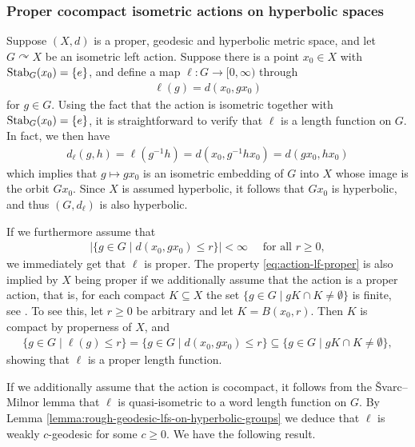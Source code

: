 \documentclass[12pt,a4paper,oneside,final,reqno]{amsart}
\def\acts{\curvearrowright}
\theoremstyle{plain}
\theoremstyle{definition}
\begin{document}
\subsubsection{Proper cocompact isometric actions on hyperbolic spaces}
Suppose $(X,d)$ is a proper, geodesic and hyperbolic metric space, and let $G \acts X$ be an  
isometric left action. 
Suppose there is a point $x_0 \in X$ with ${\rm Stab}_G (x_0) = \{e\}$, 
and define a map $\ell \colon G \to [0,\infty)$ through
\begin{align}\label{eq:length-function-from-action}
    \ell(g) = d(x_0 , g x_0)
\end{align}
for $g \in G$. Using the fact that the action is isometric together with ${\rm Stab}_G(x_0) = \{e\}$, it is straightforward to verify that $\ell$ is a length function on $G$. In fact, we then have
\begin{align*}
    d_{\ell}(g,h) = \ell(g^{-1}h) = d(x_0 , g^{-1}hx_0) = d(gx_0, hx_0)
\end{align*}
which implies that $g \mapsto g x_0$ is an isometric embedding of $G$ into $X$ whose image is the orbit $Gx_0$. Since $X$ is assumed hyperbolic, it follows that $Gx_0$ is hyperbolic, and thus $(G, d_\ell)$ is also hyperbolic. 

If we furthermore assume that
\begin{align}\label{eq:action-lf-proper}
    |\{g \in G \mid d(x_0, gx_0) \leq r \} |< \infty \quad \text{ for all $r \geq 0$},
\end{align}
we immediately get that 
$\ell$ is proper. The property \eqref{eq:action-lf-proper} is also implied by $X$ being proper if we additionally assume that the action is a proper action, that is, for each compact $K \subseteq X$ the set $\{g \in G \mid gK \cap K \neq \emptyset \}$ is finite, see \cite[I.8.3]{BridsonHaefligerMetricSpacesBook}. To see this, let $r\geq 0$ be arbitrary and let $K = B(x_0, r)$. Then $K$ is compact by properness of $X$, and 
\begin{align*}
    \{g \in G \mid \ell(g) \leq r \} = \{g \in G \mid d(x_0 , gx_0) \leq r \} \subseteq \{g \in G \mid gK \cap K \neq \emptyset \},
\end{align*}
showing that $\ell$ is a proper length function. 

If we additionally assume that the action is cocompact, it follows from the \v{S}varc--Milnor lemma \cite[Proposition I.8.19]{BridsonHaefligerMetricSpacesBook} that $\ell$ is quasi-isometric to a word length function on $G$. By Lemma \ref{lemma:rough-geodesic-lfs-on-hyperbolic-groups} we deduce that $\ell$ is weakly $c$-geodesic for some $c\geq 0$. We have the following result. 
\end{document}
